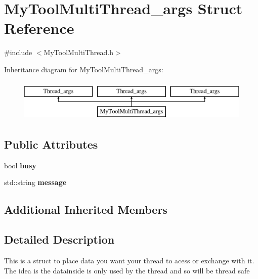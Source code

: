\hypertarget{structMyToolMultiThread__args}{\section{My\-Tool\-Multi\-Thread\-\_\-args Struct Reference}
\label{structMyToolMultiThread__args}
}


{\ttfamily \#include $<$My\-Tool\-Multi\-Thread.\-h$>$}

Inheritance diagram for My\-Tool\-Multi\-Thread\-\_\-args\-:\begin{figure}[H]
\begin{center}
\leavevmode
\includegraphics[height=2.000000cm]{structMyToolMultiThread__args}
\end{center}
\end{figure}
\subsection*{Public Attributes}
\begin{DoxyCompactItemize}
\item 
\hypertarget{structMyToolMultiThread__args_a25e00c4f60078d432869910f475fff9b}{bool {\bfseries busy}}\label{structMyToolMultiThread__args_a25e00c4f60078d432869910f475fff9b}

\item 
\hypertarget{structMyToolMultiThread__args_a05324a4ea6b7c87b2cc09473ab9027f5}{std\-::string {\bfseries message}}\label{structMyToolMultiThread__args_a05324a4ea6b7c87b2cc09473ab9027f5}

\end{DoxyCompactItemize}
\subsection*{Additional Inherited Members}


\subsection{Detailed Description}
This is a struct to place data you want your thread to acess or exchange with it. The idea is the datainside is only used by the thread and so will be thread safe

